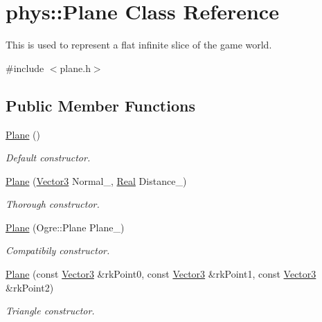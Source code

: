 \hypertarget{classphys_1_1Plane}{
\section{phys::Plane Class Reference}
\label{d1/d0c/classphys_1_1Plane}
}


This is used to represent a flat infinite slice of the game world.  




{\ttfamily \#include $<$plane.h$>$}

\subsection*{Public Member Functions}
\begin{DoxyCompactItemize}
\item 
\hyperlink{classphys_1_1Plane_a8896c8a09a604fff0668e5044889bea7}{Plane} ()
\begin{DoxyCompactList}\small\item\em Default constructor. \item\end{DoxyCompactList}\item 
\hyperlink{classphys_1_1Plane_a921d5668dfee52875ba025528604182f}{Plane} (\hyperlink{classphys_1_1Vector3}{Vector3} Normal\_\-, \hyperlink{namespacephys_af7eb897198d265b8e868f45240230d5f}{Real} Distance\_\-)
\begin{DoxyCompactList}\small\item\em Thorough constructor. \item\end{DoxyCompactList}\item 
\hyperlink{classphys_1_1Plane_aa6c075364461a2996a6575fb022c47a9}{Plane} (Ogre::Plane Plane\_\-)
\begin{DoxyCompactList}\small\item\em Compatibily constructor. \item\end{DoxyCompactList}\item 
\hyperlink{classphys_1_1Plane_a9b0fde4e97a7391259b2e659e46b3c30}{Plane} (const \hyperlink{classphys_1_1Vector3}{Vector3} \&rkPoint0, const \hyperlink{classphys_1_1Vector3}{Vector3} \&rkPoint1, const \hyperlink{classphys_1_1Vector3}{Vector3} \&rkPoint2)
\begin{DoxyCompactList}\small\item\em Triangle constructor. \item\end{DoxyCompactList}\item 

\end{DoxyCompactItemize}
